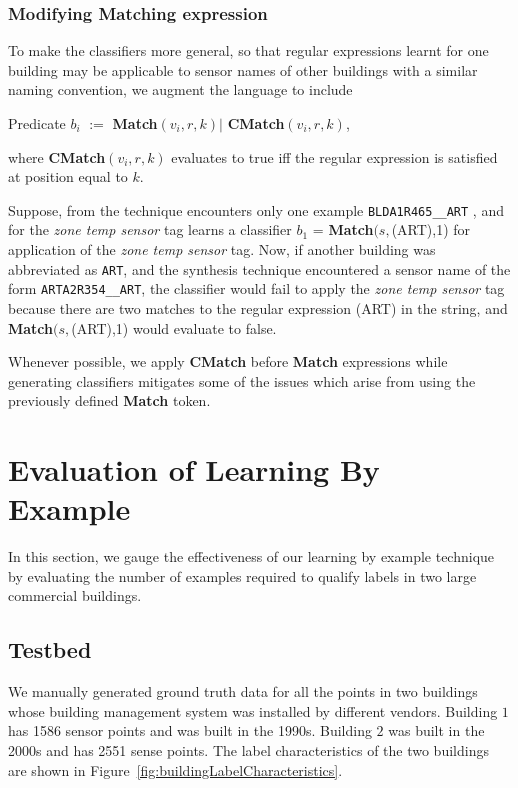 \subsubsection{Modifying Matching expression}

To make the classifiers more general, so that regular expressions learnt for one building may be applicable to sensor names of other buildings with a similar naming convention, we augment the language to include 

Predicate {\bf $b_i$} $:=$ {\bf Match}$(v_i, r, k) |$  {\bf CMatch}$(v_i, r , k)$,

where  {\bf CMatch}$(v_i, r , k)$ evaluates to true iff the regular expression is satisfied at position equal to $k$. 

Suppose, from the technique encounters only one example \texttt{BLDA1R465\_\_ART} , and for the {\it zone temp sensor} tag learns a classifier $b_1$ =  {\bf Match}$(s,$(ART),1) for application of the {\it zone temp sensor} tag. Now, if another building was abbreviated as \texttt{ART}, and the synthesis technique encountered a sensor name of the form \texttt{ARTA2R354\_\_ART}, the classifier would fail to apply the {\it zone temp sensor} tag because there are two matches to the regular expression (ART) in the string, and  {\bf Match}$(s,$(ART),1) would evaluate to false.

Whenever possible, we apply {\bf CMatch} before {\bf Match} expressions while generating classifiers mitigates some of the issues which arise from using the previously defined {\bf Match} token.



\section{Evaluation of Learning By Example}
\label{sec:eval}

In this section, we gauge the effectiveness of our learning by example technique by evaluating the number of examples required to qualify labels in two large commercial buildings. 

\subsection{Testbed}

We manually generated ground truth data for all the points in two buildings whose building management system was installed by different vendors. Building $1$ has 1586 sensor points and was built in the 1990s. Building $2$ was built in the 2000s and has 2551 sense points. The label characteristics of the two buildings are shown in Figure~\ref{fig:buildingLabelCharacteristics}. 

